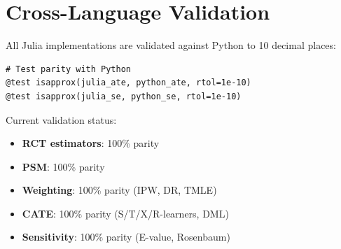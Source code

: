 \section{Cross-Language Validation}
\label{sec:julia_validation}

All Julia implementations are validated against Python to 10 decimal places:

\begin{verbatim}
# Test parity with Python
@test isapprox(julia_ate, python_ate, rtol=1e-10)
@test isapprox(julia_se, python_se, rtol=1e-10)
\end{verbatim}

Current validation status:
\begin{itemize}
    \item \textbf{RCT estimators}: 100\% parity
    \item \textbf{PSM}: 100\% parity
    \item \textbf{Weighting}: 100\% parity (IPW, DR, TMLE)
    \item \textbf{CATE}: 100\% parity (S/T/X/R-learners, DML)
    \item \textbf{Sensitivity}: 100\% parity (E-value, Rosenbaum)
\end{itemize}

